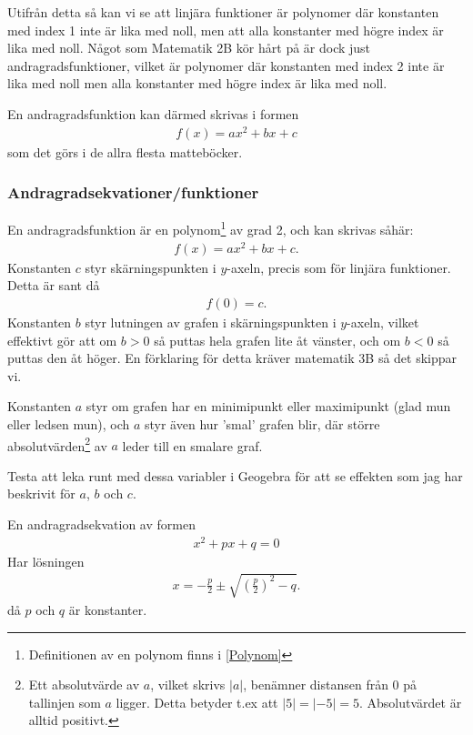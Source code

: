 Utifrån detta så kan vi se att linjära funktioner är polynomer där konstanten med index 1 inte är lika med noll, men att alla konstanter med högre index är lika med noll. Något som Matematik 2B kör hårt på är dock just andragradsfunktioner, vilket är polynomer där konstanten med index 2 inte är lika med noll men alla konstanter med högre index är lika med noll.

En andragradsfunktion kan därmed skrivas i formen
\begin{align}
	f(x) = ax^2 + bx + c
\end{align}
som det görs i de allra flesta matteböcker.

\newpage
\subsubsection{Andragradsekvationer/funktioner}

En andragradsfunktion är en polynom\footnote{Definitionen av en polynom finns i \ref{Polynom}} av grad 2, och kan skrivas såhär:
\begin{align}
	f(x) = ax^2+bx+c.
\end{align}
Konstanten $c$ styr skärningspunkten i $y$-axeln, precis som för linjära funktioner. Detta är sant då
\begin{align}
	f(0) = c.
\end{align}
Konstanten $b$ styr lutningen av grafen i skärningspunkten i $y$-axeln, vilket effektivt gör att om $b>0$ så puttas hela grafen lite åt vänster, och om $b<0$ så puttas den åt höger. En förklaring för detta kräver matematik 3B så det skippar vi.

Konstanten $a$ styr om grafen har en minimipunkt eller maximipunkt (glad mun eller ledsen mun), och $a$ styr även hur 'smal' grafen blir, där större absolutvärden\footnote{Ett absolutvärde av $a$, vilket skrivs $|a|$, benämner distansen från $0$ på tallinjen som $a$ ligger. Detta betyder t.ex att $|5|=|-5|=5$. Absolutvärdet är alltid positivt.} av $a$ leder till en smalare graf.

Testa att leka runt med dessa variabler i Geogebra för att se effekten som jag har beskrivit för $a$, $b$ och $c$.

\newpage
\begin{theorem}[pq-formeln]
	En andragradsekvation av formen
	\begin{align}
		x^2+px+q = 0
	\end{align}
	Har lösningen
	\begin{align}
		x = -\frac{p}{2}\pm \sqrt{\left(\frac{p}{2}\right)^2 - q}.
	\end{align}
	då $p$ och $q$ är konstanter.
\end{theorem}

